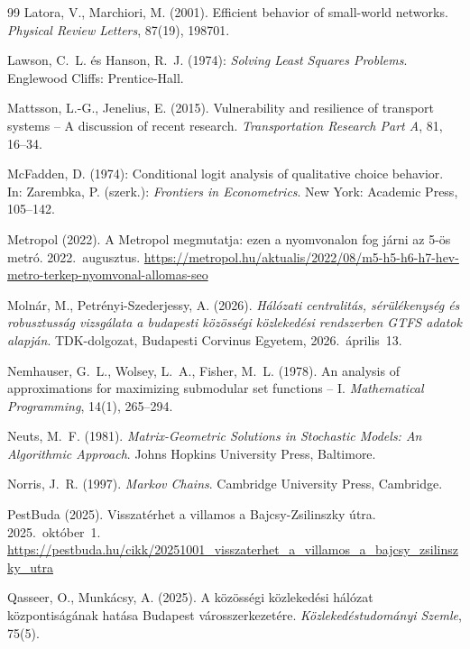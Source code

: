 \documentclass[12pt,a4paper]{article}
\theoremstyle{definition}
\theoremstyle{remark}
\begin{document}
\begin{thebibliography}{99}
Latora, V., Marchiori, M. (2001). Efficient behavior of small-world networks.
\emph{Physical Review Letters}, 87(19), 198701.

Lawson, C.~L. és Hanson, R.~J. (1974): \emph{Solving Least Squares Problems}.
Englewood Cliffs: Prentice-Hall.

Mattsson, L.-G., Jenelius, E. (2015). Vulnerability and resilience of
transport systems -- A discussion of recent research. \emph{Transportation
Research Part A}, 81, 16--34.

McFadden, D. (1974): Conditional logit analysis of qualitative choice
behavior. In: Zarembka, P. (szerk.): \emph{Frontiers in Econometrics}. New
York: Academic Press, 105--142.

Metropol (2022). A Metropol megmutatja: ezen a nyomvonalon fog járni az 5-ös
metró. 2022.~augusztus.
\url{https://metropol.hu/aktualis/2022/08/m5-h5-h6-h7-hev-metro-terkep-nyomvonal-allomas-seo}

Molnár, M., Petrényi-Szederjessy, A. (2026). \emph{Hálózati centralitás,
sérülékenység és robusztusság vizsgálata a budapesti közösségi közlekedési
rendszerben GTFS adatok alapján}. TDK-dolgozat, Budapesti Corvinus Egyetem,
2026.~április~13.

Nemhauser, G.~L., Wolsey, L.~A., Fisher, M.~L. (1978). An analysis of
approximations for maximizing submodular set functions -- I.
\emph{Mathematical Programming}, 14(1), 265--294.

Neuts, M.~F. (1981). \emph{Matrix-Geometric Solutions in Stochastic Models: An
Algorithmic Approach}. Johns Hopkins University Press, Baltimore.

Norris, J.~R. (1997). \emph{Markov Chains}. Cambridge University Press,
Cambridge.

PestBuda (2025). Visszatérhet a villamos a Bajcsy-Zsilinszky útra.
2025.~október~1.
\url{https://pestbuda.hu/cikk/20251001_visszaterhet_a_villamos_a_bajcsy_zsilinszky_utra}

Qasseer, O., Munkácsy, A. (2025). A közösségi közlekedési hálózat
központiságának hatása Budapest városszerkezetére.
\emph{Közlekedéstudományi Szemle}, 75(5).


\end{thebibliography}
\end{document}
